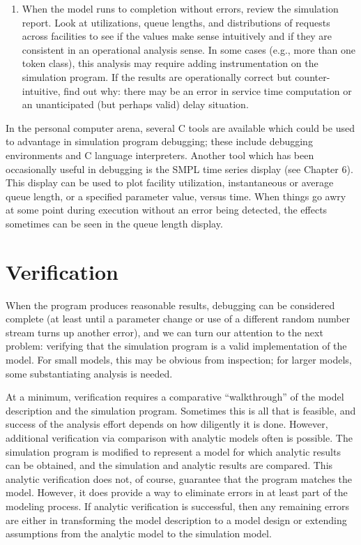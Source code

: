 \begin{enumerate}
\item When the model runs to completion without errors, review the simulation
report. Look at utilizations, queue lengths, and distributions of requests
across facilities to see if the values make sense intuitively and if they are
consistent in an operational analysis sense. In some cases (e.g., more than
one token class), this analysis may require adding instrumentation on the
simulation program. If the results are operationally correct but
counter-intuitive, find out why: there may be an error in service time
computation or an unanticipated (but perhaps valid) delay situation.
\end{enumerate}

In the personal computer arena, several C tools are available which could be
used to advantage in simulation program debugging; these include debugging
environments and C language interpreters. Another tool which has been
occasionally useful in debugging is the SMPL time series display (see Chapter
6). This display can be used to plot facility utilization, instantaneous or
average queue length, or a specified parameter value, versus time. When things
go awry at some point during execution without an error being detected, the
effects sometimes can be seen in the queue length display.

\section{Verification}
\label{sec:verification}

When the program produces reasonable results, debugging can be considered
complete (at least until a parameter change or use of a different random
number stream turns up another error), and we can turn our attention to the
next problem: verifying that the simulation program is a valid implementation
of the model. For small models, this may be obvious from inspection; for larger
models, some substantiating analysis is needed.

At a minimum, verification requires a comparative ``walkthrough'' of the model
description and the simulation program. Sometimes this is all that is
feasible, and success of the analysis effort depends on how diligently it is
done. However, additional verification via comparison with analytic models
often is possible. The simulation program is modified to represent a model for
which analytic results can be obtained, and the simulation and analytic results
are compared. This analytic verification does not, of course, guarantee that
the program matches the model. However, it does provide a way to eliminate
errors in at least part of the modeling process. If analytic verification is
successful, then any remaining errors are either in transforming the model
description to a model design or extending assumptions from the analytic model
to the simulation model.


